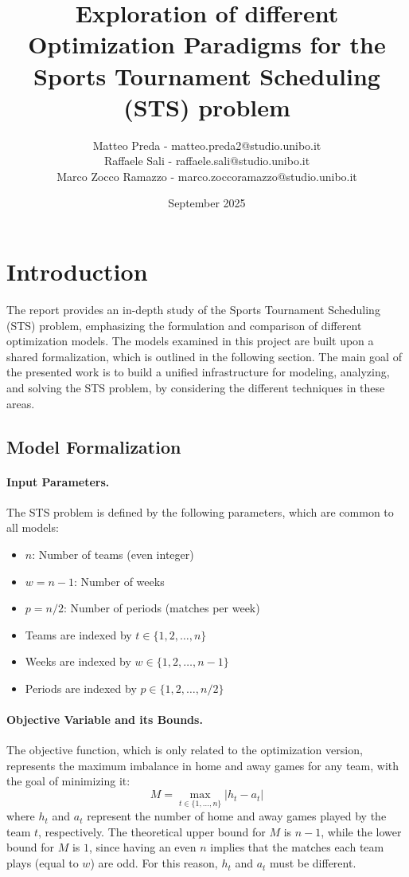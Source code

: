 \documentclass{article}
\title{ \textbf{Exploration of different Optimization Paradigms for the Sports Tournament Scheduling (STS) problem}}
\author{Matteo Preda - matteo.preda2@studio.unibo.it \\ Raffaele Sali - raffaele.sali@studio.unibo.it \\ Marco Zocco Ramazzo - marco.zoccoramazzo@studio.unibo.it}
\date{September 2025}
\begin{document}
\maketitle

\section{Introduction}
The report provides an in-depth study of the Sports Tournament Scheduling (STS) problem, emphasizing the formulation and comparison of different optimization models. The models examined in this project are built upon a shared formalization, which is outlined in the following section. The main goal of the presented work is to build a unified infrastructure for modeling, analyzing, and solving the STS problem, by considering the different techniques in these areas.  

\subsection{Model Formalization}

\paragraph{Input Parameters.}
The STS problem is defined by the following parameters, which are common to all models:
\begin{itemize}
    \item $n$: Number of teams (even integer)
    \item $w = n-1$: Number of weeks
    \item $p = n/2$: Number of periods (matches per week)
    \item Teams are indexed by $t \in \{1, 2, \ldots, n\}$
    \item Weeks are indexed by $w \in \{1, 2, \ldots, n-1\}$
    \item Periods are indexed by $p \in \{1, 2, \ldots, n/2\}$
\end{itemize}

\paragraph{Objective Variable and its Bounds.}
The objective function, which is only related to the optimization version, represents the maximum imbalance in home and away games for any team, with the goal of minimizing it:
\[
M = \max_{t \in \{1, \ldots, n\}} |h_t - a_t|
\]
where $h_t$ and $a_t$ represent the number of home and away games played by the team $t$, respectively. 
The theoretical upper bound for $M$ is $n-1$, while the lower bound for $M$ is $1$, since having an even $n$ implies that the matches each team plays (equal to $w$) are odd. For this reason, $h_t$ and $a_t$ must be different.
\end{document}
